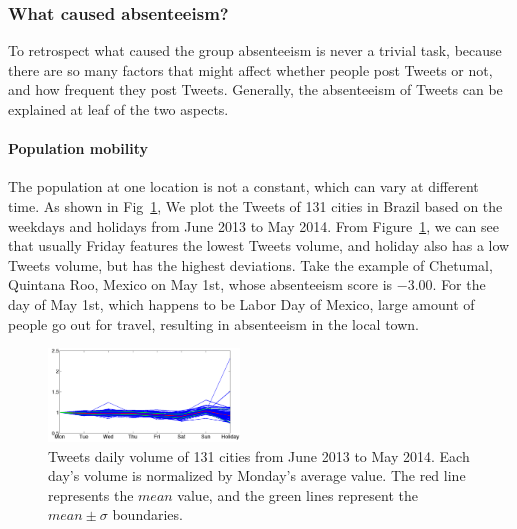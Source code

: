 \subsubsection{What caused absenteeism?}
To retrospect what caused the group absenteeism is never a trivial task,  because there are so many factors that might affect whether people post Tweets or not, and how frequent they post Tweets. Generally, the absenteeism of Tweets can be explained at leaf of the two aspects.

\paragraph{Population mobility}
The population at one location is not a constant, which can vary at different time. As shown in Fig~\ref{fig:holidays_brazil}, We plot the Tweets of 131 cities in Brazil based on the weekdays and holidays from June 2013 to May 2014. From Figure~\ref{fig:holidays_brazil}, we can see that usually Friday features the lowest Tweets volume, and holiday also has a low Tweets volume, but has the highest deviations. Take the example of Chetumal, Quintana Roo, Mexico on May 1st, whose absenteeism score is $-3.00$. For the day of May 1st, which happens to be Labor Day of Mexico, large amount of people go out for travel, resulting in absenteeism in the local town.

\begin{figure}[h]
	\centering
	\includegraphics[width=2in]{figures/HolidayCurve_Brazil.png}
	\caption{Tweets daily volume of 131 cities from June 2013 to May 2014. Each day's volume is normalized by Monday's average value. The red line represents the $mean$ value, and the green lines represent the $mean\pm \sigma$ boundaries.
	}
	\label{fig:holidays_brazil}
\end{figure}

